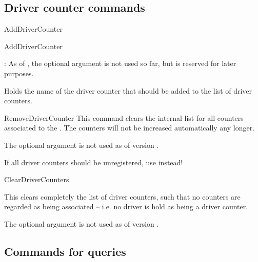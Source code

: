 \documentclass[12pt,a4paper,oneside]{article}
\def\packageversion{\xassoccntpackageversion}%
\begin{document}
\clearpage


\subsection[Driver macros]{Driver counter commands} \label{subsection::drivercounterscmds}


\begin{docCommand}{AddDriverCounter}{}

\begin{docCommandArgs}{AddDriverCounter}%

\begin{codeoptionsenum}
\item {}: As of \packageversion, the optional argument  is not used so far, but is reserved for later purposes. 

  \item {} 

    Holds the name of the driver counter that should be added to the list of driver counters.
\end{codeoptionsenum}
\end{docCommandArgs}

\end{docCommand}%



\begin{docCommand}{RemoveDriverCounter}{}
This command clears the internal list for all counters associated to the . The counters will not be increased automatically any longer.

The optional argument is not used as of version \packageversion.

If all driver counters should be unregistered, use  instead!
\end{docCommand}


\begin{docCommand}{ClearDriverCounters}{}%

This clears completely the list of driver counters, such that no counters are regarded as being associated -- i.e. no driver is hold as being a driver counter.

The optional argument is not used as of version \packageversion. 

\end{docCommand}


\subsection[Query macros]{Commands for queries} \label{subsection::querycmds}
\end{document}
